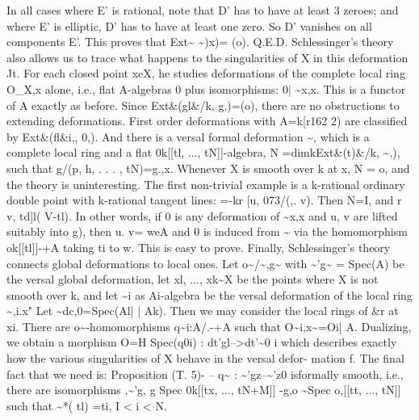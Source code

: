 \documentclass[11pt]{article}
\theoremstyle{plain}
\theoremstyle{definition}
\theoremstyle{remark}
\begin{document}
In all cases where E' is rational, note that D' has to have at least 3 zeroes; and where E' is elliptic, D' has to have at least one zero. So D' vanishes on all components E'. This proves that Ext\textasciitilde{} \textasciitilde{})x)= (o). Q.E.D. Schlessinger's theory also allows us to trace what happens to the singularities of X in this deformation Jt. For each closed point xeX, he studies deformations of the complete local ring O\_X,x alone, i.e., flat A-algebras 0 plus isomorphisms: 0| \textasciitilde{}x,x. This is a functor of A exactly as before. Since Ext\&(gl\&/k, g,)=(o), there are no obstructions to extending deformations. First order deformations with A=k[r162 2) are classified by Ext\&(fl\&i,, 0,). And there is a versal formal deformation \textasciitilde{}, which is a complete local ring and a flat 0k[[tl, ..., tN]]-algebra, N =dimkExt\&(t)\&/k, \textasciitilde{},), such that g/(p, h, . . . , tN)=g.,x. Whenever X is smooth over k at x, N = o, and the theory is uninteresting. The first non-trivial example is a k-rational ordinary double point with k-rational tangent lines: =-kr [u, 073/(,. v). Then N=I, and r v, td]l( V-tl). In other words, if 0 is any deformation of \textasciitilde{}x,x and u, v are lifted suitably into g), then u. v= weA and 0 is induced from \textasciitilde{} via the homomorphism ok[[tl]]-+A taking ti to w. This is easy to prove. Finally, Schlessinger's theory connects global deformations to local ones. Let o\textasciitilde{}/\textasciitilde{},g\textasciitilde{} with \textasciitilde{}'g\textasciitilde{} = Spec(A) be the versal global deformation, let xl, ..., xk\textasciitilde{}X be the points where X is not smooth over k, and let \textasciitilde{}i as Ai-algebra be the versal deformation of the local ring \textasciitilde{},i.x" Let \textasciitilde{}dc,0=Spec(Al| | Ak). Then we may consider the local rings of \&r at xi. There are o\textasciitilde{}-homomorphisms q\textasciitilde{}i:A/.-+A such that O\textasciitilde{}i,x\textasciitilde{}=Oi| A. Dualizing, we obtain a morphism O=H Spec(q0i) : dt'gl-->dt'\textasciitilde{}0 i which describes exactly how the various singularities of X behave in the versal defor- mation f. The final fact that we need is: Proposition (T. 5)- -- q\textasciitilde{} : \textasciitilde{}'gz--\textasciitilde{}'z0 isformally smooth, i.e., there are isomorphisms ,\textasciitilde{}'g, g Spec 0k[[tx, ..., tN+M]] -g,o \textasciitilde{}Spec o,[[tt, ..., tN]] such that \textasciitilde{}*( tl) =ti, I < i < N.
\end{document}

